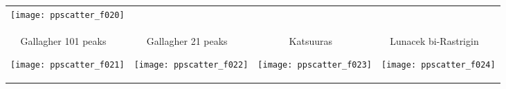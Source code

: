 \documentclass{sig-alternate}
\begin{document}
\begin{figure*}
\begin{tabular}{*{4}{@{}c@{}}}
    \texttt{[image: ppscatter\_f020]}\\[-2.2ex]
\begin{turn}{90}\parbox{0.21\textwidth}{\hfill{} Gallagher 101 peaks \hfill~}\end{turn} 
    \texttt{[image: ppscatter\_f021]}&
\begin{turn}{90}\parbox{0.21\textwidth}{\hfill{} Gallagher 21 peaks \hfill~}\end{turn} 
    \texttt{[image: ppscatter\_f022]}&
\begin{turn}{90}\parbox{0.21\textwidth}{\hfill{} Katsuuras \hfill~}\end{turn} 
    \texttt{[image: ppscatter\_f023]}&
\begin{turn}{90}\parbox{0.21\textwidth}{\hfill{} Lunacek bi-Rastrigin \hfill~}\end{turn} 
    \texttt{[image: ppscatter\_f024]}
\end{tabular}
\caption{\label{fig:scatterplots}
}
\end{figure*}


 
\end{document}
